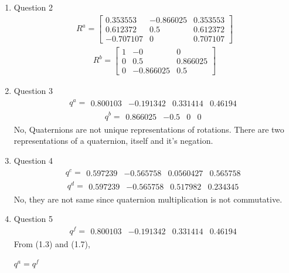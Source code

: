 \documentclass[paper=a4, fontsize=11pt]{scrartcl} %
\numberwithin{equation}{section} %
\numberwithin{figure}{section} %
\numberwithin{table}{section} %
\begin{document}
\begin{enumerate}
\item Question 2
\begin{align}
R^{a} = 
\begin{bmatrix}
0.353553 &-0.866025  &0.353553 \\
0.612372  &0.5  &0.612372 \\
-0.707107 &0  &0.707107
\end{bmatrix}
\end{align}
\begin{align}
R^{b} = 
\begin{bmatrix}
1        &-0         &0 \\
0       &0.5  &0.866025 \\
0 &-0.866025       &0.5
\end{bmatrix}
\end{align}
\item Question 3
\begin{align}
q^{a} = 
\begin{matrix}
0.800103 &-0.191342 &0.331414 &0.46194
\end{matrix}
\end{align}
\begin{align}
q^{b} = 
\begin{matrix}
0.866025 &-0.5 &0 &0
\end{matrix}
\end{align}
No, Quaternions are not unique representations of rotations. There are two representations of a quaternion, itself and it's negation.
\item Question 4
\begin{align}
q^{c} = 
\begin{matrix}
0.597239 &-0.565758 &0.0560427 &0.565758
\end{matrix}
\end{align}
\begin{align}
q^{d} = 
\begin{matrix}
0.597239 &-0.565758 &0.517982 &0.234345
\end{matrix}
\end{align}
No, they are not same since quaternion multiplication is not commutative.
\item Question 5
\begin{align}
q^{f} = 
\begin{matrix}
0.800103 &-0.191342 &0.331414 &0.46194
\end{matrix}
\end{align}
From (1.3) and (1.7),
\begin{center}$q^{a} = q^{f}$\end{center}

\end{enumerate}
\pagebreak
\end{document}

